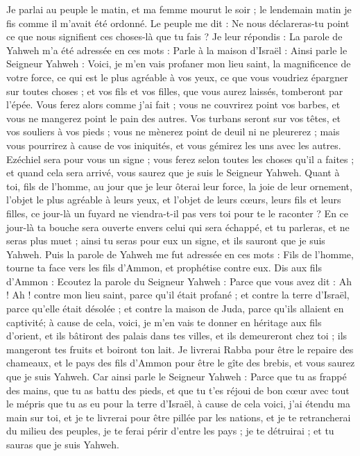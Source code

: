 \begin{multicols}{2}
Je parlai au peuple le matin, et ma femme mourut le soir ; le lendemain matin je fis comme il m'avait été ordonné.
Le peuple me dit : Ne nous déclareras-tu point ce que nous signifient ces choses-là que tu fais ?
Je leur répondis : La parole de Yahweh m'a été adressée en ces mots :
Parle à la maison d'Israël : Ainsi parle le Seigneur Yahweh : Voici, je m'en vais profaner mon lieu saint, la magnificence de votre force, ce qui est le plus agréable à vos yeux, ce que vous voudriez épargner sur toutes choses ; et vos fils et vos filles, que vous aurez laissés, tomberont par l'épée.
Vous ferez alors comme j'ai fait ; vous ne couvrirez point vos barbes, et vous ne mangerez point le pain des autres.
Vos turbans seront sur vos têtes, et vos souliers à vos pieds ; vous ne mènerez point de deuil ni ne pleurerez ; mais vous pourrirez à cause de vos iniquités, et vous gémirez les uns avec les autres.
Ezéchiel sera pour vous un signe ; vous ferez selon toutes les choses qu'il a faites ; et quand cela sera arrivé, vous saurez que je suis le Seigneur Yahweh.
Quant à toi, fils de l’homme, au jour que je leur ôterai leur force, la joie de leur ornement, l'objet le plus agréable à leurs yeux, et l'objet de leurs cœurs, leurs fils et leurs filles,
ce jour-là un fuyard ne viendra-t-il pas vers toi pour te le raconter ?
En ce jour-là ta bouche sera ouverte envers celui qui sera échappé, et tu parleras, et ne seras plus muet ; ainsi tu seras pour eux un signe, et ils sauront que je suis Yahweh.
\VerseOne{}Puis la parole de Yahweh me fut adressée en ces mots :
Fils de l’homme, tourne ta face vers les fils d’Ammon, et prophétise contre eux\FTNT{}.
Dis aux fils d’Ammon : Ecoutez la parole du Seigneur Yahweh : Parce que vous avez dit : Ah ! Ah ! contre mon lieu saint, parce qu'il était profané ; et contre la terre d'Israël, parce qu'elle était désolée ; et contre la maison de Juda, parce qu'ils allaient en captivité\FTNT{};
à cause de cela, voici, je m'en vais te donner en héritage aux fils d'orient, et ils bâtiront des palais dans tes villes, et ils demeureront chez toi ; ils mangeront tes fruits et boiront ton lait.
Je livrerai Rabba pour être le repaire des chameaux, et le pays des fils d’Ammon pour être le gîte des brebis, et vous saurez que je suis Yahweh.
Car ainsi parle le Seigneur Yahweh : Parce que tu as frappé des mains, que tu as battu des pieds, et que tu t'es réjoui de bon cœur avec tout le mépris que tu as eu pour la terre d'Israël,
à cause de cela voici, j'ai étendu ma main sur toi, et je te livrerai pour être pillée par les nations, et je te retrancherai du milieu des peuples, je te ferai périr d'entre les pays ; je te détruirai ; et tu sauras que je suis Yahweh.

\end{multicols}
